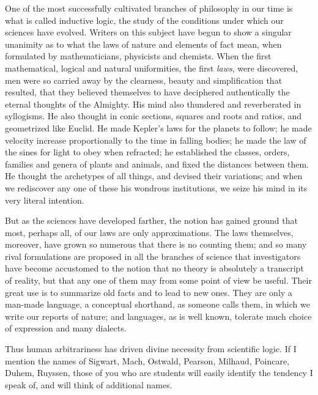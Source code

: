 \documentclass[]{article}
\begin{document}
One of the most successfully cultivated branches of philosophy in our
time is what is called inductive logic, the study of the conditions
under which our sciences have evolved. Writers on this subject have
begun to show a singular unanimity as to what the laws of nature and
elements of fact mean, when formulated by mathematicians, physicists and
chemists. When the first mathematical, logical and natural uniformities,
the first \emph{laws}, were discovered, men were so carried away by the
clearness, beauty and simplification that resulted, that they believed
themselves to have deciphered authentically the eternal thoughts of the
Almighty. His mind also thundered and reverberated in syllogisms.
He also thought in conic sections, squares and roots and ratios, and
geometrized like Euclid. He made Kepler's laws for the planets to
follow; he made velocity increase proportionally to the time in falling
bodies; he made the law of the sines for light to obey when refracted;
he established the classes, orders, families and genera of plants and
animals, and fixed the distances between them. He thought the archetypes
of all things, and devised their variations; and when we rediscover any
one of these his wondrous institutions, we seize his mind in its very
literal intention.

But as the sciences have developed farther, the notion has gained ground
that most, perhaps all, of our laws are only approximations. The laws
themselves, moreover, have grown so numerous that there is no counting
them; and so many rival formulations are proposed in all the branches of
science that investigators have become accustomed to the notion that no
theory is absolutely a transcript of reality, but that any one of them
may from some point of view be useful. Their great use is to summarize
old facts and to lead to new ones. They are only a man-made language,
a conceptual shorthand, as someone calls them, in which we write our
reports of nature; and languages, as is well known, tolerate much choice
of expression and many dialects.

Thus human arbitrariness has driven divine necessity from scientific
logic. If I mention the names of Sigwart, Mach, Ostwald, Pearson,
Milhaud, Poincare, Duhem, Ruyssen, those of you who are students will
easily identify the tendency I speak of, and will think of additional
names.
\end{document}

